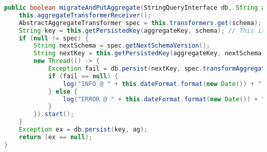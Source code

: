 \begin{lstlisting}[language=Java, label={mput}, caption={Metode for håndtering av PUT-spørringer i Migrator.}]
public boolean migrateAndPutAggregate(StringQueryInterface db, String aggregateKey, String schema, String ag) {
    this.aggregateTransformerReceiver();
    AbstractAggregateTransformer spec = this.transformers.get(schema);
    String key = this.getPersistedKey(aggregateKey, schema); // This is the key used by the application
    if (null != spec) {
        String nextSchema = spec.getNextSchemaVersion();
        String nextKey = this.getPersistedKey(aggregateKey, nextSchema);
        new Thread(() -> {
            Exception fail = db.persist(nextKey, spec.transformAggregate(ag));
            if (fail == null) {
                log("INFO @ " + this.dateFormat.format(new Date()) + " - Migrated aggregate with key " + key + " to " + nextKey + "\n");
            } else {
                log("ERROR @ " + this.dateFormat.format(new Date()) + " - Error during persisting " + nextKey + "\n" + fail.toString() + "\n");
            }
        }).start();
    }
    Exception ex = db.persist(key, ag);
    return (ex == null);
}
\end{lstlisting}
